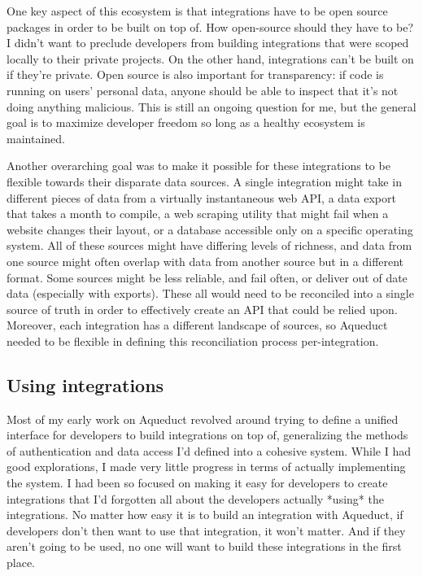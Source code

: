 \documentclass[manuscript,review,anonymous]{acmart}
\begin{document}
One key aspect of this ecosystem is that integrations have to be open source packages in order to be built on top of. How open-source should they have to be? I didn't want to preclude developers from building integrations that were scoped locally to their private projects. On the other hand, integrations can't be built on if they're private. Open source is also important for transparency: if code is running on users' personal data, anyone should be able to inspect that it's not doing anything malicious. This is still an ongoing question for me, but the general goal is to maximize developer freedom so long as a healthy ecosystem is maintained.

Another overarching goal was to make it possible for these integrations to be flexible towards their disparate data sources. A single integration might take in different pieces of data from a virtually instantaneous web API, a data export that takes a month to compile, a web scraping utility that might fail when a website changes their layout, or a database accessible only on a specific operating system. All of these sources might have differing levels of richness, and data from one source might often overlap with data from another source but in a different format. Some sources might be less reliable, and fail often, or deliver out of date data (especially with exports). These all would need to be reconciled into a single source of truth in order to effectively create an API that could be relied upon. Moreover, each integration has a different landscape of sources, so Aqueduct needed to be flexible in defining this reconciliation process per-integration.

\subsection{Using integrations}
Most of my early work on Aqueduct revolved around trying to define a unified interface for developers to build integrations on top of, generalizing the methods of authentication and data access I'd defined into a cohesive system. While I had good explorations, I made very little progress in terms of actually implementing the system. I had been so focused on making it easy for developers to create integrations that I'd forgotten all about the developers actually *using* the integrations. No matter how easy it is to build an integration with Aqueduct, if developers don't then want to use that integration, it won't matter. And if they aren't going to be used, no one will want to build these integrations in the first place.
\end{document}
